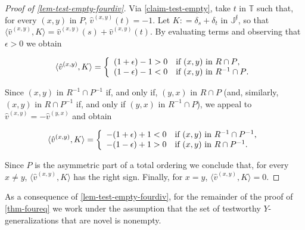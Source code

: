 \documentclass[12pt,a4paper,twoside]{article}
\newcommand{\novel}{\mathfrak f}
\newcommand{\mbbt}{{\mathds {T}}}
\newcommand{\mbbjp}{{\mathds {J}^{\novel}}}
\newcommand{\xy}{{(x, y)}}
\newcommand{\yx}{{(y, x)}}
\begin{document}
\begin{appendices}
\begin{proof}[Proof of \cref{lem-test-empty-fourdiv}]
  Via \cref{claim-test-empty}, take $t$ in $\mbbt$ such that, for every
  $\xy$ in $P$, $\hat{v}^{ \xy } ( t ) = -1$.  Let
  $K : = \delta _{ s } + \delta _{ t }$ in $\mbbjp$, so that
  $\langle \hat{v}^{\xy}, K \rangle = \hat{v}^{\xy}(s) + \hat{v}^{\xy}(t)$. By evaluating
  terms and observing that $\epsilon > 0$ we obtain
\begin{linenomath*}  
 \begin{equation*}
   \langle  \hat{v}^{\xy}, K \rangle =
   \left \{
      \begin{array}{l l}
        (1+ \epsilon) - 1 > 0  & \text{if $\xy$ in ${R} \cap P  $},\\
                 (1- \epsilon) - 1 < 0 & \text{if $\xy$ in ${R}^{-1}\cap P$}.
      \end{array}
    \right.
  \end{equation*}
\end{linenomath*}  
  Since $\xy$ in ${R}^{-1} \cap P^{-1}$ if, and only if,
  $\yx$ in ${R}\cap P$ (and, similarly,
  $\xy$ in ${R} \cap P^{-1}$ if, and only if $\yx$ in
  ${R}^{-1}\cap P$), we appeal to $\hat{v}^{\xy} = - \hat{v}^{\yx}$ and obtain
\begin{linenomath*}
 \begin{equation*}
   \langle  \hat{v}^{\xy}, K \rangle =
   \left \{
      \begin{array}{l l}
        -( 1 + \epsilon) + 1 < 0 & \text{if $\xy$ in ${R}^{-1} \cap P^{-1}$,}\\
        -(1- \epsilon) + 1 > 0  & \text{if $\xy$ in ${R} \cap P^{-1} $.}
      \end{array}
    \right.
  \end{equation*}
\end{linenomath*}
Since
$P$ is the asymmetric part of a total ordering we conclude that, for every
$x\neq y$, $\langle \hat{v}^{\xy}, K \rangle$ has the right sign. Finally, for $x = y$, $\langle \hat{v}^{\xy}, K \rangle =
0$.
\end{proof}

As a consequence of \cref{lem-test-empty-fourdiv}, for the remainder of the proof of
\cref{thm-foureq} we work under the assumption that the set of testworthy
$Y$-{generalization}s that are novel is nonempty. 


\end{appendices}
\end{document}
